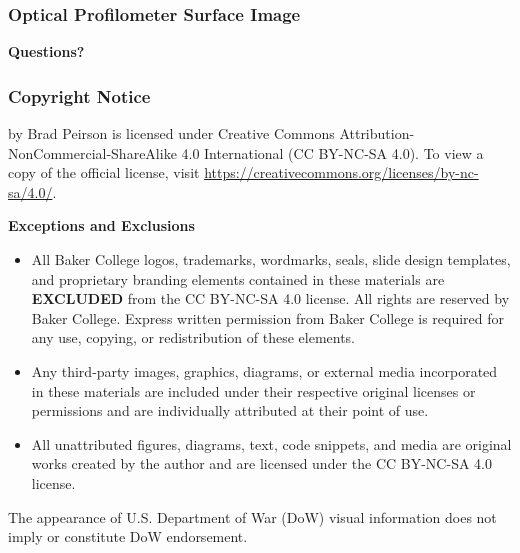 \begin{frame}
	\frametitle{Optical Profilometer Surface Image}
    
\end{frame}

\begin{frame}
    \centering
    {\Huge \textbf{\textcolor{BakerADARed}{Questions?}}}
\end{frame}

\begin{frame}
    \frametitle{Copyright Notice}
    
    {\scriptsize
    \PresTitle {} by Brad Peirson is licensed under Creative Commons Attribution-NonCommercial-ShareAlike 4.0 International (CC BY-NC-SA 4.0). To view a copy of the official license, visit \href{https://creativecommons.org/licenses/by-nc-sa/4.0/}{https://creativecommons.org/licenses/by-nc-sa/4.0/}.

    \vspace{0.5em}

    \textbf{Exceptions and Exclusions}

    \begin{itemize}
        \item[Baker College Branding \& Trademarks:]All Baker College logos, trademarks, wordmarks, seals, slide design templates, and proprietary branding elements contained in these materials are \textbf{EXCLUDED} from the CC BY-NC-SA 4.0 license. All rights are reserved by Baker College. Express written permission from Baker College is required for any use, copying, or redistribution of these elements.
        \item[Third-Party Media \& Content:] Any third-party images, graphics, diagrams, or external media incorporated in these materials are included under their respective original licenses or permissions and are individually attributed at their point of use. 
        \item[Original Author Content:] All unattributed figures, diagrams, text, code snippets, and media are original works created by the author and are licensed under the CC BY-NC-SA 4.0 license.
    \end{itemize}

    The appearance of U.S. Department of War (DoW) visual information does not imply or constitute DoW endorsement.
    \par}
\end{frame}





